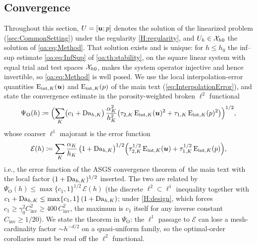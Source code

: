 \subsection{Convergence}
\label{oa:sec:convergence}

Throughout this section, $U = [\boldsymbol{u}; p]$ denotes the solution of
the linearized problem (\cref{sec:CommonSetting}) under the regularity \cref{H:regularity}, and $U_h \in \mathcal{X}_{h0}$ the solution of
\cref{oa:eq:Method}. That solution exists and is unique: for $h \le h_0$ the inf--sup estimate
\cref{oa:eq:InfSup} of \cref{oa:th:stability}, on the square linear system with equal trial and
test spaces $\mathcal{X}_{h0}$, makes the system operator injective and hence invertible, so
\cref{oa:eq:Method} is well posed. We use the local interpolation{\hyp}error quantities
$\mathrm{E}_{\mathrm{int},K}(\boldsymbol{u})$ and $\mathrm{E}_{\mathrm{int},K}(p)$ of the main text (\cref{eq:InterpolationError}), and state
the convergence estimate in the porosity-weighted broken $\ell^2$ functional
\begin{equation}
  \label{oa:eq:ErrorFunctionL2}
  \Psi_{\mathrm O}(h)
  \coloneqq
  \Bigl( \sum_K \bigl( c_1 + \mathrm{Da}_{h,K} \bigr)\,\frac{\alpha_K^2}{h_K^2}
  \bigl( \tau_{2,K}\,\mathrm{E}_{\mathrm{int},K}(\boldsymbol{u})^2 + \tau_{1,K}\,\mathrm{E}_{\mathrm{int},K}(p)^2 \bigr) \Bigr)^{1/2},
\end{equation}
whose coarser $\ell^1$ majorant is the error function
\begin{equation}
  \label{oa:eq:ErrorFunction}
  \mathcal{E}(h)
  \coloneqq
  \sum_K \frac{\alpha_K}{h_K}\,\bigl(1 + \mathrm{Da}_{h,K}\bigr)^{1/2}
  \Bigl( \tau_{2,K}^{1/2}\,\mathrm{E}_{\mathrm{int},K}(\boldsymbol{u}) + \tau_{1,K}^{1/2}\,\mathrm{E}_{\mathrm{int},K}(p) \Bigr),
\end{equation}
i.e., the error function of the ASGS convergence theorem of~the main text with the
local factor $(1+\mathrm{Da}_{h,K})^{1/2}$ inserted. The two are related by
$\Psi_{\mathrm O}(h) \le \max\{c_1,1\}^{1/2}\,\mathcal{E}(h)$ (the discrete $\ell^2\subset\ell^1$
inequality together with $c_1+\mathrm{Da}_{h,K} \le \max\{c_1,1\}\,(1+\mathrm{Da}_{h,K})$; under \cref{H:design}, which forces $c_1\ge\gamma_0^2C_{\mathrm{inv}}^2\ge400\,C_{\mathrm{inv}}^2$, the maximum is $c_1$ itself for any inverse constant $C_{\mathrm{inv}}\ge1/20$). We state the theorem in
$\Psi_{\mathrm O}$: the $\ell^1$ passage to $\mathcal{E}$ can lose a mesh-cardinality
factor $\sim h^{-d/2}$ on a quasi-uniform family, so the optimal-order corollaries
must be read off the $\ell^2$ functional.

